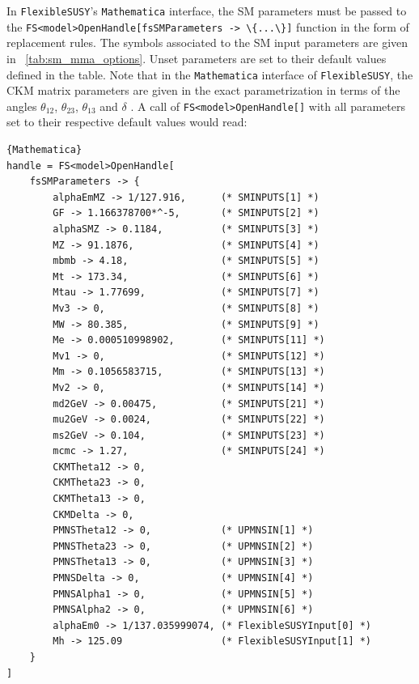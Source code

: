 \documentclass[final,3p,11pt,pdflatex]{elsarticle}
\makeatletter
\newcommand{\fs}{\texttt{FlexibleSUSY}\@\xspace}
\newcommand{\mathematica}{\texttt{Ma\-the\-ma\-ti\-ca}\xspace}
\newcommand{\code}[1]{\lstinline|#1|}  %
\newcommand{\tabref}[1]{\tablename~\ref{#1}}
\makeatother
\begin{document}
In \fs's \mathematica interface, the SM parameters must be
passed to the \code{FS<model>OpenHandle[fsSMParameters -> \{...\}]}
function in the form of replacement rules.  The symbols associated to the
SM input parameters are given in
\tabref{tab:sm_mma_options}.  Unset parameters are set to their
default values defined in the table.  Note that in the \mathematica
interface of \fs, the CKM matrix parameters are given in the
exact parametrization in terms of the angles $\theta_{12}$,
$\theta_{23}$, $\theta_{13}$ and $\delta$ \cite{Olive:2016xmw}.  A
call of \code{FS<model>OpenHandle[]} with all parameters set to their
respective default values would read:
%
\begin{lstlisting}{Mathematica}
handle = FS<model>OpenHandle[
    fsSMParameters -> {
        alphaEmMZ -> 1/127.916,      (* SMINPUTS[1] *)
        GF -> 1.166378700*^-5,       (* SMINPUTS[2] *)
        alphaSMZ -> 0.1184,          (* SMINPUTS[3] *)
        MZ -> 91.1876,               (* SMINPUTS[4] *)
        mbmb -> 4.18,                (* SMINPUTS[5] *)
        Mt -> 173.34,                (* SMINPUTS[6] *)
        Mtau -> 1.77699,             (* SMINPUTS[7] *)
        Mv3 -> 0,                    (* SMINPUTS[8] *)
        MW -> 80.385,                (* SMINPUTS[9] *)
        Me -> 0.000510998902,        (* SMINPUTS[11] *)
        Mv1 -> 0,                    (* SMINPUTS[12] *)
        Mm -> 0.1056583715,          (* SMINPUTS[13] *)
        Mv2 -> 0,                    (* SMINPUTS[14] *)
        md2GeV -> 0.00475,           (* SMINPUTS[21] *)
        mu2GeV -> 0.0024,            (* SMINPUTS[22] *)
        ms2GeV -> 0.104,             (* SMINPUTS[23] *)
        mcmc -> 1.27,                (* SMINPUTS[24] *)
        CKMTheta12 -> 0,
        CKMTheta23 -> 0,
        CKMTheta13 -> 0,
        CKMDelta -> 0,
        PMNSTheta12 -> 0,            (* UPMNSIN[1] *)
        PMNSTheta23 -> 0,            (* UPMNSIN[2] *)
        PMNSTheta13 -> 0,            (* UPMNSIN[3] *)
        PMNSDelta -> 0,              (* UPMNSIN[4] *)
        PMNSAlpha1 -> 0,             (* UPMNSIN[5] *)
        PMNSAlpha2 -> 0,             (* UPMNSIN[6] *)
        alphaEm0 -> 1/137.035999074, (* FlexibleSUSYInput[0] *)
        Mh -> 125.09                 (* FlexibleSUSYInput[1] *)
    }
]
\end{lstlisting}
%
\end{document}
